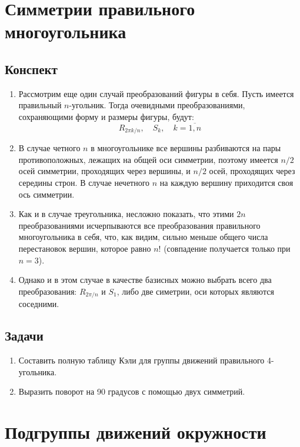 \section{Симметрии правильного многоугольника}

\subsection*{Конспект}
\begin{enumerate}\setlength{\itemsep}{1pt}
\item Рассмотрим еще один случай преобразований фигуры в себя. Пусть имеется правильный $n$-угольник. Тогда очевидными преобразованиями, сохраняющими форму и размеры фигуры, будут:
$$
R_{2\pi k/n},\quad S_k,\quad k=\overline{1,n}
$$
\item В случае четного $n$ в многоугольнике все вершины разбиваются на пары противоположных, лежащих на общей оси симметрии, поэтому имеется $n/2$ осей симметрии, проходящих через вершины, и $n/2$ осей, проходящих через середины строн. В случае нечетного $n$ на каждую вершину приходится своя ось симметрии.
\item Как и в случае треугольника, несложно показать, что этими $2n$ преобразованиями исчерпываются все преобразования правильного многоугольника в себя, что, как видим, сильно меньше общего числа перестановок вершин, которое равно $n!$ (совпадение получается только при $n=3$).
\item Однако и в этом случае в качестве базисных можно выбрать всего два преобразования: $R_{2\pi/n}$ и $S_1$, либо две симетрии, оси которых являются соседними.
\end{enumerate}
\subsection*{Задачи}
\begin{enumerate}
\item Составить полную таблицу Кэли для группы движений правильного 4-угольника.
\item Выразить поворот на 90 градусов с помощью двух симметрий.
\end{enumerate}


\section{Подгруппы движений окружности}

